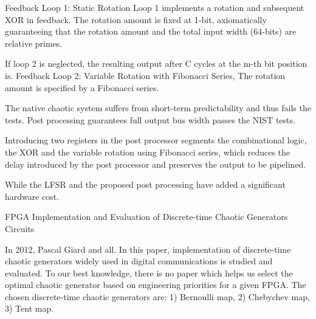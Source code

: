   Feedback Loop 1: Static Rotation Loop 1 implements a rotation and subsequent XOR in feedback. The rotation amount is fixed at 1-bit, axiomatically guaranteeing that the rotation amount and the total input width (64-bits) are relative primes. 
 
 If loop 2 is neglected, the resulting output after C cycles at the m-th bit position is. Feedback Loop 2: Variable Rotation with Fibonacci Series,  The rotation amount is specified by a Fibonacci series. 
 
 The native chaotic system suffers from short-term predictability and thus fails the tests. Post processing guarantees full output bus width passes the NIST tests. 
 
  Introducing two registers in the post processor segments the combinational logic, the XOR and the variable rotation using Fibonacci series, which reduces the delay introduced by the post processor and preserves the output to be pipelined. 
  
  While the LFSR and the proposed post processing have added a significant hardware cost.

FPGA Implementation and Evaluation of Discrete-time Chaotic Generators Circuits

In 2012, Pascal Giard and all. In this paper, implementation of discrete-time chaotic generators widely used in digital communications is studied and evaluated. To our best knowledge, there is no paper which helps us select the optimal chaotic generator based on engineering priorities for a given FPGA. The chosen discrete-time chaotic generators are: 1) Bernoulli map, 2) Chebychev map, 3) Tent map. 



